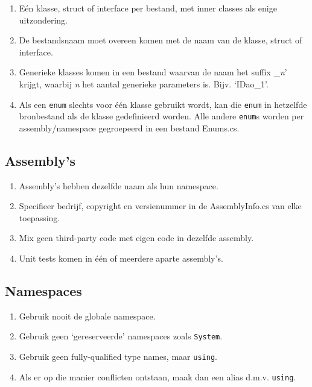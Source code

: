 \documentclass[a4paper,11pt]{article}
\begin{document}
\begin{enumerate}[resume]
\item E\'en klasse, struct of interface per bestand, met inner classes als enige uitzondering.
\item De bestandsnaam moet overeen komen met de naam van de klasse, struct
of interface.
\item Generieke klasses  komen in een bestand waarvan de naam het suffix
\_{\em n}' krijgt, waarbij {\em n} het aantal generieke parameters
is.  Bijv. `IDao\_1'.
\item Als een \lstinline !enum! slechts voor \'e\'en klasse gebruikt
wordt, kan die \lstinline !enum! in hetzelfde bronbestand als de klasse
gedefinieerd worden.  Alle andere \lstinline !enum!s worden per
assembly/namespace gegroepeerd in een bestand Enums.cs.

\end{enumerate}

\subsection{Assembly's}

\begin{enumerate}[resume]
\item Assembly's hebben dezelfde naam als hun namespace.
\item Specifieer bedrijf, copyright en versienummer in de AssemblyInfo.cs van
elke toepassing.
\item Mix geen third-party code met eigen code in dezelfde assembly.
\item Unit tests komen in \'e\'en of meerdere aparte
assembly's.
\end{enumerate}

\subsection{Namespaces}

\begin{enumerate}[resume]
\item Gebruik nooit de globale namespace.
\item Gebruik geen `gereserveerde' namespaces zoals \lstinline !System!.
\item Gebruik geen fully-qualified type names, maar \lstinline !using!.
\item Als er op die manier conflicten ontstaan, maak dan een alias d.m.v.
\lstinline !using!.
\end{enumerate}
\end{document}
